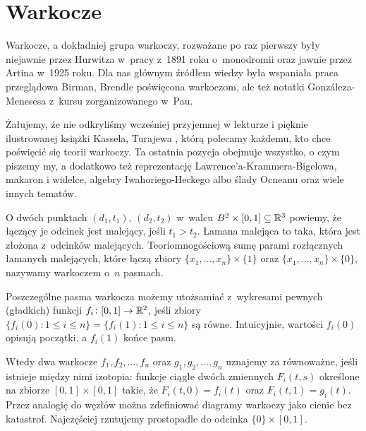 
\section{Warkocze}
\label{sec:braid}%
%
Warkocze, a dokładniej grupa warkoczy, rozważane po raz pierwszy były niejawnie przez Hurwitza w~pracy z~1891 roku o~monodromii oraz jawnie przez Artina \cite{artin25} w~1925 roku.
%
Dla nas głównym źródłem wiedzy była wspaniała praca przeglądowa Birman, Brendle \cite{birman05} poświęcona warkoczom, ale też notatki Gonzáleza-Menesesa \cite{gonzalez11} z~kursu zorganizowanego w~Pau.
%
%
%

Żałujemy, że nie odkryliśmy wcześniej przyjemnej w lekturze i pięknie ilustrowanej książki Kassela, Turajewa \cite{kassel08}, którą polecamy każdemu, kto chce poświęcić się teorii warkoczy.
%
%
Ta ostatnia pozycja obejmuje wszystko, o czym piszemy my, a dodatkowo też reprezentację Lawrence'a-Krammera-Bigelowa, makaron i widelce, algebry Iwahoriego-Heckego albo ślady Ocneanu oraz wiele innych tematów.
%
%
%
%

\begin{definition}[warkocz]
%
O dwóch punktach $(d_1, t_1)$, $(d_2, t_2)$ w~walcu $B^2 \times [0, 1] \subseteq \mathbb R^3$ powiemy, że łączący je odcinek jest malejący, jeśli $t_1 > t_2$.
Łamana malejąca to taka, która jest złożona z~odcinków malejących.
Teoriomnogościową sumę parami rozłącznych łamanych malejących, które łączą zbiory $\{x_1, \ldots, x_n\} \times \{1\}$ oraz $\{x_1, \ldots, x_n\} \times \{0\}$, nazywamy warkoczem o~$n$ pasmach.
\end{definition}

Poszczególne pasma warkocza możemy utożsamiać z~wykresami pewnych (gładkich) funkcji $f_i \colon [0, 1] \to \mathbb R^2$, jeśli zbiory $\{f_i(0) : 1 \le i \le n\} = \{f_i(1) : 1 \le i \le n\}$ są równe.
Intuicyjnie, wartości $f_i(0)$ opisują początki, a $f_i(1)$ końce pasm.

Wtedy dwa warkocze $f_1, f_2, \ldots, f_n$ oraz $g_1, g_2, \ldots, g_n$ uznajemy za równoważne, jeśli istnieje między nimi izotopia: funkcje ciągłe dwóch zmiennych $F_i(t, s)$ określone na zbiorze $[0,1] \times [0,1]$ takie, że $F_i(t,0)= f_i(t)$ oraz $F_i(t, 1) = g_i(t)$.
Przez analogię do węzłów można zdefiniować diagramy warkoczy jako cienie bez katastrof.
Najczęściej rzutujemy prostopadle do odcinka $\{0\} \times [0, 1]$.

